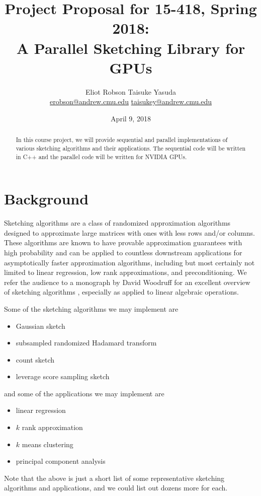 \documentclass[12pt]{article}
\begin{document}
\title{
    \normalsize Project Proposal for 15-418, Spring 2018: \\
    \LARGE A Parallel Sketching Library for GPUs
}
\author{Eliot Robson \qquad Taisuke Yasuda\\ \small
\href{mailto:erobson@andrew.cmu.edu}{erobson@andrew.cmu.edu} \quad \href{mailto:taisukey@andrew.cmu.edu}{taisukey@andrew.cmu.edu}}
\date{April 9, 2018}

\maketitle

\begin{abstract}
	In this course project, we will provide sequential and parallel implementations of various sketching algorithms and their applications. The sequential code will be written in C++ and the parallel code will be written for NVIDIA GPUs. 
\end{abstract}

\section{Background}
Sketching algorithms are a class of randomized approximation algorithms designed to approximate large matrices with ones with less rows and/or columns. These algorithms are known to have provable approximation guarantees with high probability and can be applied to countless downstream applications for asymptotically faster approximation algorithms, including but most certainly not limited to linear regression, low rank approximations, and preconditioning. We refer the audience to a monograph by David Woodruff for an excellent overview of sketching algorithms \cite{woodruff2014sketching}, especially as applied to linear algebraic operations.

Some of the sketching algorithms we may implement are
\begin{itemize}
	\item Gaussian sketch
	\item subsampled randomized Hadamard transform
	\item count sketch
	\item leverage score sampling sketch
\end{itemize}
and some of the applications we may implement are
\begin{itemize}
	\item linear regression
	\item $k$ rank approximation
	\item $k$ means clustering
	\item principal component analysis
\end{itemize}
Note that the above is just a short list of some representative sketching algorithms and applications, and we could list out dozens more for each.
\end{document}
